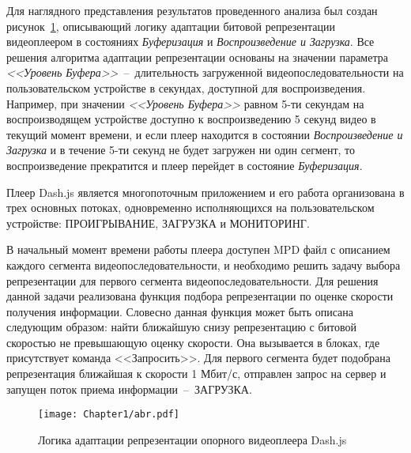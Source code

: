 Для наглядного представления результатов проведенного анализа был создан рисунок~\ref{fig:abr}, описывающий логику адаптации битовой репрезентации видеоплеером в состояниях \textit{Буферизация} и \textit{Воспроизведение и Загрузка}. Все решения алгоритма адаптации репрезентации основаны на значении параметра \textit{<<Уровень Буфера>>}~--~длительность загруженной видеопоследовательности на пользовательском устройстве в секундах, доступной для воспроизведения. Например, при значении \textit{<<Уровень Буфера>>} равном 5-ти секундам на воспроизводящем устройстве доступно к воспроизведению 5 секунд видео в текущий момент времени, и если плеер находится в состоянии \textit{Воспроизведение и Загрузка} и в течение 5-ти секунд не будет загружен ни один сегмент, то воспроизведение прекратится и плеер перейдет в состояние \textit{Буферизация}.

Плеер Dash.js является многопоточным приложением и его работа организована в трех основных потоках, одновременно исполняющихся на пользовательском устройстве: ПРОИГРЫВАНИЕ, ЗАГРУЗКА и МОНИТОРИНГ.

В начальный момент времени работы плеера доступен MPD файл с описанием каждого сегмента видеопоследовательности, и необходимо решить задачу выбора репрезентации для первого сегмента видеопоследовательности. Для решения данной задачи реализована функция подбора репрезентации по оценке скорости получения информации. Словесно данная функция может быть описана следующим образом: найти ближайшую снизу репрезентацию с битовой скоростью не превышающую оценку скорости. Она вызывается в блоках, где присутствует команда <<Запросить>>. Для первого сегмента будет подобрана репрезентация ближайшая к скорости 1 Мбит/с, отправлен запрос на сервер и запущен поток приема информации~--~ЗАГРУЗКА.

\begin{landscape}
\begin{figure}[h]
\begin{center}
\texttt{[image: Chapter1/abr.pdf]}
\caption{Логика адаптации репрезентации опорного видеоплеера Dash.js}
\label{fig:abr}
\end{center}
\end{figure}
\end{landscape}

